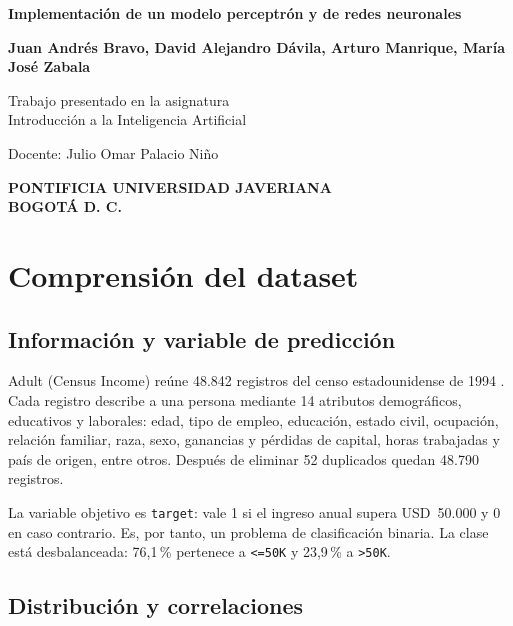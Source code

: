 \documentclass[12pt,letterpaper,oneside]{article}
\begin{document}
\begin{titlepage}
    \centering
    \thispagestyle{empty}
    \vspace*{1cm}
    {\bfseries Implementación de un modelo perceptrón y de redes neuronales\par}
    \vfill
    {\bfseries Juan Andrés Bravo, David Alejandro Dávila, Arturo Manrique, María José Zabala\par}
    \vfill
    {Trabajo presentado en la asignatura\\
    Introducción a la Inteligencia Artificial\par}
    \vspace{1cm}
    {Docente: Julio Omar Palacio Niño\par}
    \vfill
    {\bfseries PONTIFICIA UNIVERSIDAD JAVERIANA\\
    BOGOTÁ D. C.

    \the\year\par}
\end{titlepage}

\setcounter{page}{2}
\tableofcontents
\thispagestyle{empty}
\clearpage

\section{Comprensión del dataset}

\subsection{Información y variable de predicción}

Adult (Census Income) reúne 48.842 registros del censo estadounidense de 1994 \cite{uci-adult}. Cada registro describe a una persona mediante 14 atributos demográficos, educativos y laborales: edad, tipo de empleo, educación, estado civil, ocupación, relación familiar, raza, sexo, ganancias y pérdidas de capital, horas trabajadas y país de origen, entre otros. Después de eliminar 52 duplicados quedan 48.790 registros.

La variable objetivo es \texttt{target}: vale 1 si el ingreso anual supera USD~50.000 y 0 en caso contrario. Es, por tanto, un problema de clasificación binaria. La clase está desbalanceada: 76,1\,\% pertenece a \texttt{<=50K} y 23,9\,\% a \texttt{>50K}.


\subsection{Distribución y correlaciones}
\end{document}
